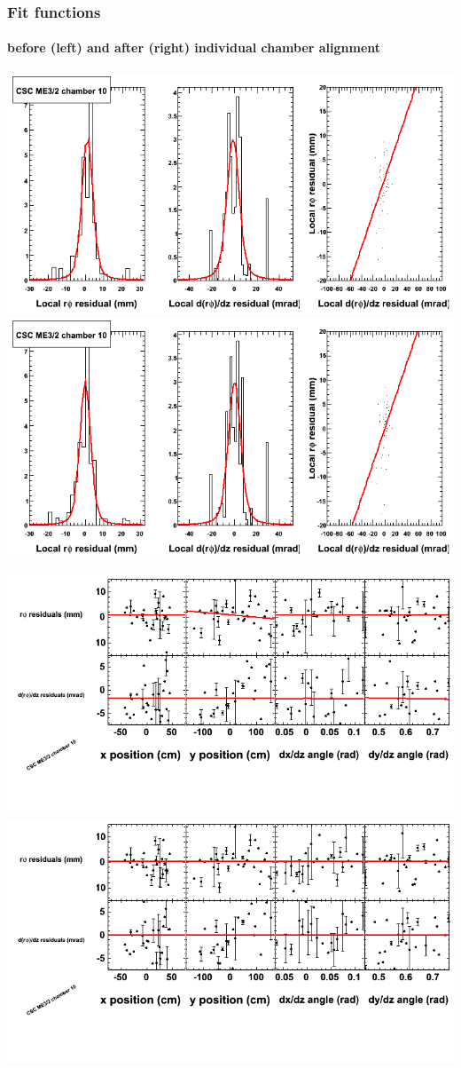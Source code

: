 \documentclass[compress]{beamer}
\begin{document}
\begin{frame}
\frametitle{Fit functions}
\framesubtitle{before (left) and after (right) individual chamber alignment}
\includegraphics[width=0.5\linewidth]{ringfits_3dof/beforefit_MEp32_10_bellcurve.png} \includegraphics[width=0.5\linewidth]{ringfits_3dof/afterfit_MEp32_10_bellcurve.png}

\includegraphics[width=0.5\linewidth]{ringfits_3dof/beforefit_MEp32_10_polynomials.png} \includegraphics[width=0.5\linewidth]{ringfits_3dof/afterfit_MEp32_10_polynomials.png}
\end{frame}
\end{document}
